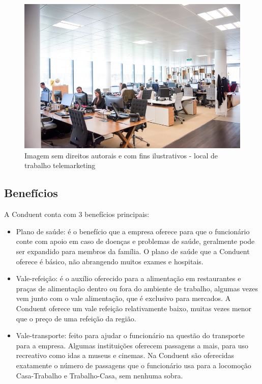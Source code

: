 \documentclass[12pt]{article}
\begin{document}
\begin{figure}[h]
	\centering
	\includegraphics[scale=0.5]{build/images/atendimento.jpg}
	\caption{Imagem sem direitos autorais e com fins ilustrativos - local de trabalho telemarketing}
\end{figure}

\newpage

\subsection{Benefícios}

A Conduent conta com 3 benefícios principais:



\begin{itemize}
\item Plano de saúde:
\subitem é o benefício que a empresa oferece para que o funcionário conte com apoio em caso de doenças e problemas de saúde, geralmente pode ser expandido para membros da família. O plano de saúde que a Conduent oferece é básico, não abrangendo muitos exames e hospitais.

\item Vale-refeição:
\subitem é o auxílio oferecido para a alimentação em restaurantes e praças de alimentação dentro ou fora do ambiente de trabalho, algumas vezes vem junto com o vale alimentação, que é exclusivo para mercados. A Conduent oferece um vale refeição relativamente baixo, muitas vezes menor que o preço de uma refeição da região.

\item Vale-transporte:
\subitem feito para ajudar o funcionário na questão do transporte para a empresa. Algumas instituições oferecem passagens a mais, para uso recreativo como idas a museus e cinemas. Na Conduent são oferecidas exatamente o número de passagens que o funcionário usa para a locomoção Casa-Trabalho e Trabalho-Casa, sem nenhuma sobra.

\end{itemize}
\end{document}
